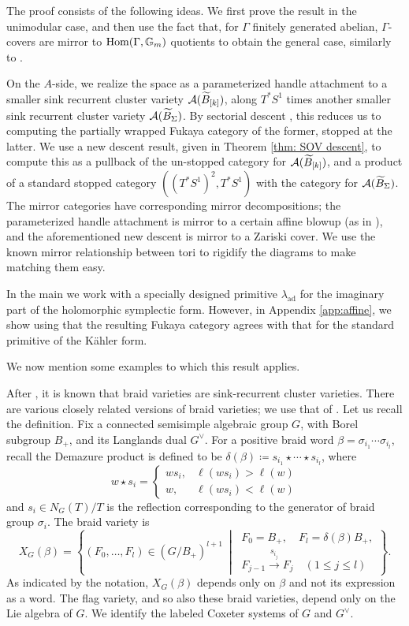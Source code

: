 \documentclass[12pt, letter]{amsart}
\theoremstyle{definition}
\begin{document}
The proof consists of the following ideas.  We first prove the result in the unimodular case, and then use the fact that, for $\Gamma$ finitely generated abelian, $\Gamma$-covers are mirror to $\operatorname{Hom}(\Gamma, \mathbb{G}_m)$ quotients to obtain the general case, similarly to  \cite{Sh21}.

On the $A$-side, we realize the space as a parameterized handle attachment to a smaller sink  recurrent cluster variety $\mathcal{A}(\widetilde B_{[k]})$, along  $T^* S^1$ times another smaller sink recurrent cluster variety $\mathcal{A}(\widetilde B_{\Sigma})$.  By sectorial descent \cite{GPS2}, this reduces us to computing the partially wrapped Fukaya category of the former, stopped at the latter.  We use a new descent result, given in Theorem \ref{thm: SOV descent}, to compute this as a pullback of the un-stopped category for $\mathcal{A}(\widetilde B_{[k]})$, and a product of a standard stopped category $((T^* S^1)^2, T^*S^1)$ with the category for $\mathcal{A}(\widetilde B_{\Sigma})$.  
The mirror categories have corresponding mirror decompositions; the parameterized handle attachment is mirror to a certain affine blowup (as in \cite{GLe}), and the aforementioned new descent is mirror to a Zariski cover.  We use the known mirror relationship between tori to rigidify the diagrams to make matching them easy. 

In the main we work with a specially designed primitive $\lambda_{\mathrm{ad}}$ for the imaginary part of the holomorphic symplectic form. However, in Appendix \ref{app:affine}, we show using \cite{HS26} that the resulting Fukaya category agrees with that for the standard primitive of the K\"ahler form.  


We now mention some examples to which this result applies. 

After \cite{CGGLSS, GLSS, GLSB}, it is known that braid varieties are sink-recurrent cluster varieties.  There are various closely related versions of braid varieties;  we use that of   \cite{CGGLSS}.  Let us recall the definition.
Fix a connected semisimple algebraic group $G$, with Borel subgroup $B_+$, and its Langlands dual $G^\vee$.
For a positive braid word $\beta=\sigma_{i_1}\cdots\sigma_{i_l}$, recall the Demazure product is defined to be \(\delta (\beta) \coloneqq s_{i_1} \star \cdots \star s_{i_l}\), where
\[
w\star s_i=
\begin{cases}
ws_i,&\ell(ws_i)>\ell(w)\\
w,&\ell(ws_i)<\ell(w)
\end{cases}
\]
and \(s_i \in N_G(T)/T\) is the reflection corresponding to the generator of braid group \(\sigma_i\).  
The braid variety is
\[
 X_G(\beta)=\left\{(F_0,\ldots,F_l)\in(G/B_+)^{l+1}\ \middle|\
 \begin{array}{l}F_0=B_+,\quad F_l= \delta(\beta)B_+,\\ F_{j-1} \xrightarrow{s_{i_j}}F_j  \quad(1\le j\le l)\end{array}\right\}.
\]
As indicated by the notation, $X_G(\beta)$ depends only on $\beta$  and not its expression as a word. The flag variety, and so also these braid varieties, depend only on the Lie algebra of $G$. We identify the labeled Coxeter systems of $G$ and $G^\vee$.
\end{document}
